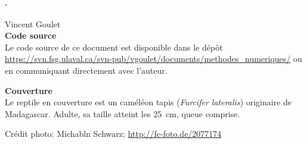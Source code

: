 \begingroup
\calccentering{\unitlength}
\begin{adjustwidth*}{\unitlength}{-\unitlength}
  \setlength{\parindent}{0pt}
  \setlength{\parskip}{\baselineskip}

  {\textcopyright} {\year} Vincent Goulet \\

  

  \sloppy
  \textbf{Code source} \\
  Le code source de ce document est disponible dans le dépôt
    \url{https://svn.fsg.ulaval.ca/svn-pub/vgoulet/documents/methodes_numeriques/}
  ou en communiquant directement avec l'auteur.

  \fussy
  \textbf{Couverture} \\
  Le reptile en couverture est un caméléon tapis (\emph{Furcifer
    lateralis}) originaire de Madagascar. Adulte, sa taille atteint
  les 25~cm, queue comprise.

  Crédit photo: Michabln Schwarz; \url{http://fc-foto.de/2077174}
\end{adjustwidth*}
\endgroup

